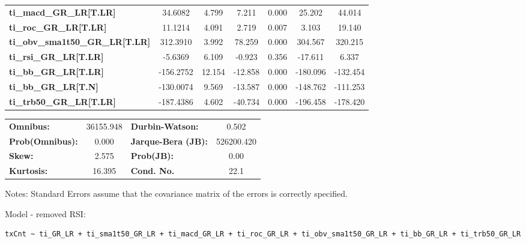 \begin{center}
\begin{tabular}{lcccccc}
\textbf{ti\_macd\_GR\_LR[T.LR]}         &      34.6082  &        4.799     &     7.211  &         0.000        &       25.202    &       44.014     \\
\textbf{ti\_roc\_GR\_LR[T.LR]}          &      11.1214  &        4.091     &     2.719  &         0.007        &        3.103    &       19.140     \\
\textbf{ti\_obv\_sma1t50\_GR\_LR[T.LR]} &     312.3910  &        3.992     &    78.259  &         0.000        &      304.567    &      320.215     \\
\textbf{ti\_rsi\_GR\_LR[T.LR]}          &      -5.6369  &        6.109     &    -0.923  &         0.356        &      -17.611    &        6.337     \\
\textbf{ti\_bb\_GR\_LR[T.LR]}           &    -156.2752  &       12.154     &   -12.858  &         0.000        &     -180.096    &     -132.454     \\
\textbf{ti\_bb\_GR\_LR[T.N]}            &    -130.0074  &        9.569     &   -13.587  &         0.000        &     -148.762    &     -111.253     \\
\textbf{ti\_trb50\_GR\_LR[T.LR]}        &    -187.4386  &        4.602     &   -40.734  &         0.000        &     -196.458    &     -178.420     \\
\bottomrule
\end{tabular}
\begin{tabular}{lclc}
\textbf{Omnibus:}       & 36155.948 & \textbf{  Durbin-Watson:     } &     0.502   \\
\textbf{Prob(Omnibus):} &    0.000  & \textbf{  Jarque-Bera (JB):  } & 526200.420  \\
\textbf{Skew:}          &    2.575  & \textbf{  Prob(JB):          } &      0.00   \\
\textbf{Kurtosis:}      &   16.395  & \textbf{  Cond. No.          } &      22.1   \\
\bottomrule
\end{tabular}
\end{center}

Notes: \newline
 [1] Standard Errors assume that the covariance matrix of the errors is correctly specified.

Model - removed RSI: \begin{verbatim}txCnt ~ ti_GR_LR + ti_sma1t50_GR_LR + ti_macd_GR_LR + ti_roc_GR_LR + ti_obv_sma1t50_GR_LR + ti_bb_GR_LR + ti_trb50_GR_LR\end{verbatim}

